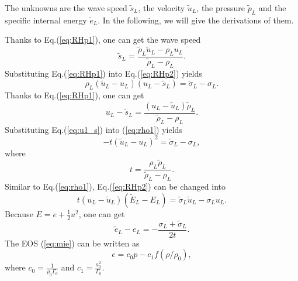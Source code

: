 \documentclass[review]{elsarticle}
\begin{document}
 The unknowns are the wave speed $\widetilde{s}_L$,  the velocity  $\widetilde{u}_L$, the pressure $\widetilde{p}_L$ and the specific internal energy $\widetilde{e}_L$. In the following, we will give the derivations of them.

 Thanks to Eq.(\ref{eq:RHp1}), one can get the wave speed
  \begin{equation}
    \widetilde{s}_L = \frac{\widetilde{\rho}_L \widetilde{u}_L-\rho_Lu_L}{\widetilde{\rho}_L-\rho_L}.
  \end{equation}
Substituting Eq.(\ref{eq:RHp1}) into Eq.(\ref{eq:RHp2}) yields
\begin{equation}\label{eq:rho1}
  \rho_L(\widetilde{u}_L - u_L)(u_L-\widetilde{s}_L) = \widetilde{\sigma}_L -\sigma_L.
\end{equation}
 Thanks to Eq.(\ref{eq:RHp1}), one can get
\begin{equation}\label{eq:u1_s}
  u_L-\widetilde{s}_L = \frac{(u_L-\widetilde{u}_L)\widetilde{\rho}_L}{\widetilde{\rho}_L-\rho_L}.
\end{equation}
Substituting Eq.(\ref{eq:u1_s}) into (\ref{eq:rho1}) yields
\begin{equation}\label{eq:tu_2}
  -t(\widetilde{u}_L-u_L)^2 = \widetilde{\sigma}_L-\sigma_L,
\end{equation}
where
\begin{equation}
t=\frac{\rho_L \widetilde{\rho}_L}{\widetilde{\rho}_L-\rho_L}.
\end{equation}
Similar to Eq.(\ref{eq:rho1}), Eq.(\ref{eq:RHp2}) can be changed into
\begin{equation}
  t(u_L-\widetilde{u}_L)(\widetilde{E}_L-E_L) =\widetilde{\sigma}_L\widetilde{u}_L-\sigma_Lu_L.
\end{equation}
Because $E = e+\frac{1}{2}u^2$, one can get
\begin{equation}\label{eq:e21}
  \widetilde{e}_L-e_L= -\frac{\sigma_L+\widetilde{\sigma}_L}{2t}.
\end{equation}
The EOS (\ref{eq:mie}) can be written as
\begin{equation} \label{eq:eos1}
  e=c_0 p-c_1f(\rho/\rho_0),
\end{equation}
where $c_0=\frac{1}{\rho_0\Gamma_0}$ and $c_1=\frac{a_0^2}{\Gamma_0}$.
\end{document}
